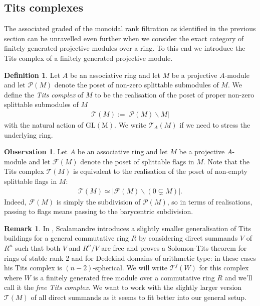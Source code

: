 \documentclass[12pt, reqno]{amsart}
\theoremstyle{plain}
\theoremstyle{definition}
\newtheorem{definition}[theorem]{Definition}
\newtheorem{remark}[theorem]{Remark}
\newtheorem{observation}[theorem]{Observation}
\begin{document}
\subsection{Tits complexes}

The associated graded of the monoidal rank filtration as identified in the previous section can be unravelled even further when we consider the exact category of finitely generated projective modules over a ring. To this end we introduce the Tits complex of a finitely generated projective module.

\begin{definition}\label{Tits complex}
Let $A$ be an associative ring and let $M$ be a projective $A$-module and let $\mathcal{P}(M)$ denote the poset of non-zero splittable submodules of $M$. We define the \textit{Tits complex} of $M$ to be the realisation of the poset of proper non-zero splittable submodules of $M$
\begin{align*}
\mathcal{T}(M):=|\mathcal{P}(M)\smallsetminus M|
\end{align*}
with the natural action of $\operatorname{GL(M)}$. We write $\mathcal{T}_A(M)$ if we need to stress the underlying ring.
\end{definition}

\begin{observation}\label{flags or submodules}
Let $A$ be an associative ring and let $M$ be a projective $A$-module and let $\mathcal{F}(M)$ denote the poset of splittable flags in $M$. Note that the Tits complex $\mathcal{T}(M)$ is equivalent to the realisation of the poset of non-empty splittable flags in $M$:
\begin{align*}
\mathcal{T}(M)\simeq |\mathcal{F}(M)\smallsetminus (0\subsetneq M)|.
\end{align*}
Indeed, $\mathcal{F}(M)$ is simply the subdivision of $\mathcal{P}(M)$, so in terms of realisations, passing to flags means passing to the barycentric subdivision.
\end{observation}

\begin{remark}\label{Scalamandre}
In \cite{Scalamandre}, Scalamandre introduces a slightly smaller generalisation of Tits buildings for a general commutative ring $R$ by considering direct summands $V$ of $R^n$ such that both $V$ and $R^n/V$ are free and proves a Solomon-Tits theorem for rings of stable rank 2 and for Dedekind domains of arithmetic type: in these cases his Tits complex is $(n-2)$-spherical. We will write $\mathcal{T}^f(W)$ for this complex where $W$ is a finitely generated free module over a commutative ring $R$ and we'll call it the \textit{free Tits complex}. We want to work with the slightly larger version $\mathcal{T}(M)$ of all direct summands as it seems to fit better into our general setup.
\end{remark}
\end{document}
